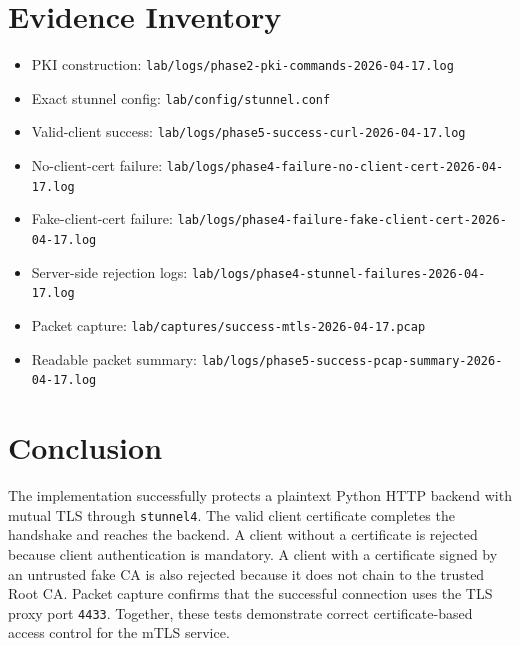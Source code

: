\documentclass[11pt]{article}
\begin{document}
\section{Evidence Inventory}

\begin{itemize}
  \item PKI construction: \texttt{lab/logs/phase2-pki-commands-2026-04-17.log}
  \item Exact stunnel config: \texttt{lab/config/stunnel.conf}
  \item Valid-client success: \texttt{lab/logs/phase5-success-curl-2026-04-17.log}
  \item No-client-cert failure: \texttt{lab/logs/phase4-failure-no-client-cert-2026-04-17.log}
  \item Fake-client-cert failure: \texttt{lab/logs/phase4-failure-fake-client-cert-2026-04-17.log}
  \item Server-side rejection logs: \texttt{lab/logs/phase4-stunnel-failures-2026-04-17.log}
  \item Packet capture: \texttt{lab/captures/success-mtls-2026-04-17.pcap}
  \item Readable packet summary: \texttt{lab/logs/phase5-success-pcap-summary-2026-04-17.log}
\end{itemize}

\section{Conclusion}

The implementation successfully protects a plaintext Python HTTP backend with mutual TLS through \texttt{stunnel4}. The valid client certificate completes the handshake and reaches the backend. A client without a certificate is rejected because client authentication is mandatory. A client with a certificate signed by an untrusted fake CA is also rejected because it does not chain to the trusted Root CA. Packet capture confirms that the successful connection uses the TLS proxy port \texttt{4433}. Together, these tests demonstrate correct certificate-based access control for the mTLS service.
\end{document}
